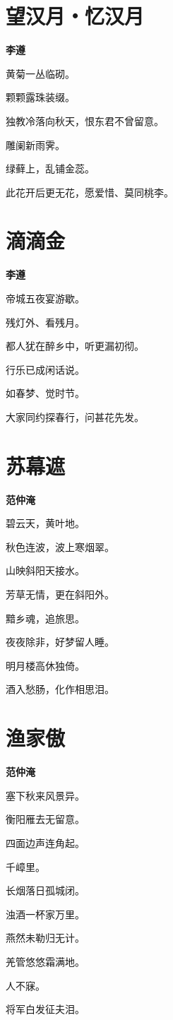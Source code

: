 \documentclass[12pt,a4paper]{ctexbook}
\begin{document}
\section{望汉月・忆汉月}
\textbf{李遵}\par\vspace{0.5em}
黄菊一丛临砌。\par
颗颗露珠装缀。\par
独教冷落向秋天，恨东君不曾留意。\par
雕阑新雨霁。\par
绿藓上，乱铺金蕊。\par
此花开后更无花，愿爱惜、莫同桃李。\par

\section{滴滴金}
\textbf{李遵}\par\vspace{0.5em}
帝城五夜宴游歇。\par
残灯外、看残月。\par
都人犹在醉乡中，听更漏初彻。\par
行乐已成闲话说。\par
如春梦、觉时节。\par
大家同约探春行，问甚花先发。\par

\section{苏幕遮}
\textbf{范仲淹}\par\vspace{0.5em}
碧云天，黄叶地。\par
秋色连波，波上寒烟翠。\par
山映斜阳天接水。\par
芳草无情，更在斜阳外。\par
黯乡魂，追旅思。\par
夜夜除非，好梦留人睡。\par
明月楼高休独倚。\par
酒入愁肠，化作相思泪。\par

\section{渔家傲}
\textbf{范仲淹}\par\vspace{0.5em}
塞下秋来风景异。\par
衡阳雁去无留意。\par
四面边声连角起。\par
千嶂里。\par
长烟落日孤城闭。\par
浊酒一杯家万里。\par
燕然未勒归无计。\par
羌管悠悠霜满地。\par
人不寐。\par
将军白发征夫泪。\par
\end{document}
